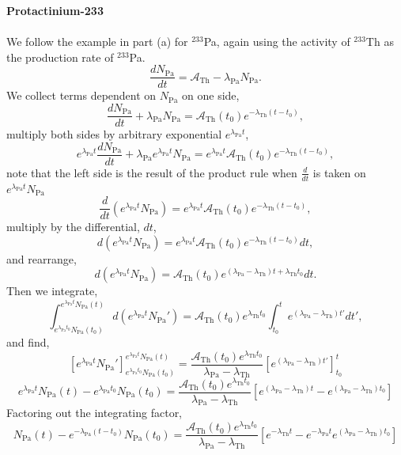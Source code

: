 \documentclass{report}
\begin{document}
\begin{enumerate}[a)]
\textbf{Protactinium-233}\\
\-\\
We follow the example in part (a) for $^{233}$Pa, again using the activity of $^{233}$Th as the production rate of $^{233}$Pa.
$$ \frac{dN_{\text{Pa}}}{dt} = \mathcal{A}_{\text{Th}} - \lambda_{\text{Pa}}N_{\text{Pa}}. $$
We collect terms dependent on $N_{\text{Pa}}$ on one side,
$$ \frac{dN_{\text{Pa}}}{dt} + \lambda_{\text{Pa}}N_{\text{Pa}} = \mathcal{A}_{\text{Th}}(t_0) e^{-\lambda_{\text{Th}}(t-t_0)}, $$
multiply both sides by arbitrary exponential $e^{\lambda_{\text{Pa}}t}$,
$$ e^{\lambda_{\text{Pa}}t}\frac{dN_{\text{Pa}}}{dt} + \lambda_{\text{Pa}}e^{\lambda_{\text{Pa}}t}N_{\text{Pa}} = e^{\lambda_{\text{Pa}}t}\mathcal{A}_{\text{Th}}(t_0) e^{-\lambda_{\text{Th}}(t-t_0)}, $$
note that the left side is the result of the product rule when $\frac{d}{dt}$ is taken on $e^{\lambda_{\text{Pa}}t}N_{\text{Pa}}$
$$ \frac{d}{dt} (e^{\lambda_{\text{Pa}}t}N_{\text{Pa}}) = e^{\lambda_{\text{Pa}}t}\mathcal{A}_{\text{Th}}(t_0) e^{-\lambda_{\text{Th}}(t-t_0)}, $$
multiply by the differential, $dt$,
$$ d(e^{\lambda_{\text{Pa}}t}N_{\text{Pa}}) = e^{\lambda_{\text{Pa}}t}\mathcal{A}_{\text{Th}}(t_0) e^{-\lambda_{\text{Th}}(t-t_0)} dt ,$$
and rearrange,
$$ d(e^{\lambda_{\text{Pa}}t}N_{\text{Pa}}) = \mathcal{A}_{\text{Th}}(t_0) e^{(\lambda_{\text{Pa}} - \lambda_{\text{Th}})t + \lambda_{\text{Th}}t_0} dt .$$
Then we integrate,
$$ \int_{e^{\lambda_{\text{Pa}}t_0}N_{\text{Pa}}(t_0)}^{e^{\lambda_{\text{Pa}}t}N_{\text{Pa}}(t)} d(e^{\lambda_{\text{Pa}}t}N_{\text{Pa}}') = \mathcal{A}_{\text{Th}}(t_0)e^{\lambda_{\text{Th}}t_0} \int_{t_0}^{t} e^{(\lambda_{\text{Pa}} - \lambda_{\text{Th}})t'} dt' ,$$
and find,
$$ \left[e^{\lambda_{\text{Pa}}t}N_{\text{Pa}}'\right]_{e^{\lambda_{\text{Pa}}t_0}N_{\text{Pa}}(t_0)}^{e^{\lambda_{\text{Pa}}t}N_{\text{Pa}}(t)} = \frac{\mathcal{A}_{\text{Th}}(t_0)e^{\lambda_{\text{Th}}t_0}}{\lambda_{\text{Pa}}-\lambda_{\text{Th}}} \left[ e^{(\lambda_{\text{Pa}}-\lambda_{\text{Th}})t'}\right]_{t_0}^{t} $$
$$ e^{\lambda_{\text{Pa}}t}N_{\text{Pa}}(t) - e^{\lambda_{\text{Pa}}t_0}N_{\text{Pa}}(t_0) = \frac{\mathcal{A}_{\text{Th}}(t_0)e^{\lambda_{\text{Th}}t_0}}{\lambda_{\text{Pa}}-\lambda_{\text{Th}}} \left[ e^{(\lambda_{\text{Pa}}-\lambda_{\text{Th}})t} - e^{(\lambda_{\text{Pa}}-\lambda_{\text{Th}})t_0} \right] $$
Factoring out the integrating factor, 
$$ N_{\text{Pa}}(t) - e^{-\lambda_{\text{Pa}}(t - t_0)}N_{\text{Pa}}(t_0) = \frac{\mathcal{A}_{\text{Th}}(t_0)e^{\lambda_{\text{Th}}t_0}}{\lambda_{\text{Pa}}-\lambda_{\text{Th}}} \left[ e^{-\lambda_{\text{Th}}t} - e^{-\lambda_{\text{Pa}}t}e^{(\lambda_{\text{Pa}}-\lambda_{\text{Th}})t_0} \right] $$

\end{enumerate}
\end{document}
